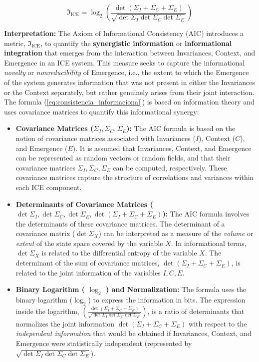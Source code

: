 \documentclass{article}
\begin{document}
\begin{equation}
\mathfrak{I}_\text{ICE} = \log_2 \left(\frac{\det(\Sigma_I + \Sigma_C + \Sigma_E)}{\sqrt{\det \Sigma_I \det \Sigma_C \det \Sigma_E}}\right)
\label{eq:consistencia_informacional}
\end{equation}
\bigskip

\textbf{Interpretation:} The Axiom of Informational Consistency (AIC) introduces a metric, $\mathfrak{I}_\text{ICE}$, to quantify the \textbf{synergistic information} or \textbf{informational integration} that emerges from the interaction between Invariances, Context, and Emergence in an ICE system. This measure seeks to capture the informational \emph{novelty} or \emph{nonreducibility} of Emergence, i.e., the extent to which the Emergence of the system generates information that was not present in either the Invariances or the Context separately, but rather genuinely arises from their joint interaction. The formula (\ref{eq:consistencia_informacional}) is based on information theory and uses covariance matrices to quantify this informational synergy:
\begin{itemize}
\item \textbf{Covariance Matrices ($\Sigma_I, \Sigma_C, \Sigma_E$):} The AIC formula is based on the notion of covariance matrices associated with Invariances ($I$), Context ($C$), and Emergence ($E$). It is assumed that Invariances, Context, and Emergence can be represented as random vectors or random fields, and that their covariance matrices $\Sigma_I, \Sigma_C, \Sigma_E$ can be computed, respectively. These covariance matrices capture the structure of correlations and variances within each ICE component.
\item \textbf{Determinants of Covariance Matrices ($\det \Sigma_I, \det \Sigma_C, \det \Sigma_E, \det(\Sigma_I + \Sigma_C + \Sigma_E)$):} The AIC formula involves the determinants of these covariance matrices. The determinant of a covariance matrix ($\det \Sigma_X$) can be interpreted as a measure of the \textit{volume} or \textit{extent} of the state space covered by the variable $X$. In informational terms, $\det \Sigma_X$ is related to the differential entropy of the variable $X$. The determinant of the sum of covariance matrices, $\det(\Sigma_I + \Sigma_C + \Sigma_E)$, is related to the joint information of the variables $I, C, E$.
\item \textbf{Binary Logarithm ( $\log_2$ ) and Normalization:} The formula uses the binary logarithm ($\log_2$) to express the information in bits. The expression inside the logarithm, $\left(\frac{\det(\Sigma_I + \Sigma_C + \Sigma_E)}{\sqrt{\det \Sigma_I \det \Sigma_C \det \Sigma_E}}\right)$, is a ratio of determinants that normalizes the joint information $\det(\Sigma_I + \Sigma_C + \Sigma_E)$ with respect to the \textit{independent information} that would be obtained if Invariances, Context, and Emergence were statistically independent (represented by $\sqrt{\det \Sigma_I \det \Sigma_C \det \Sigma_E}$).
\end{itemize}
\end{document}
